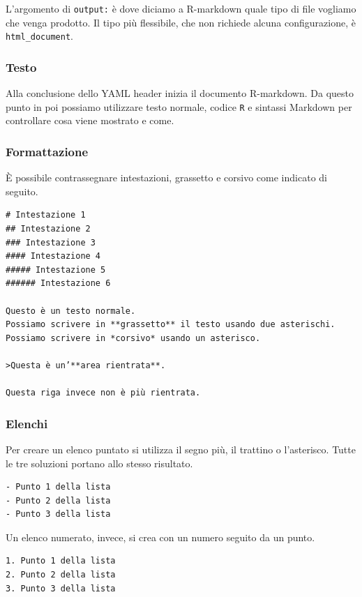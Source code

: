 \documentclass[
]{memoir}
\theoremstyle{definition}
\theoremstyle{definition}
\theoremstyle{definition}
\theoremstyle{definition}
\theoremstyle{remark}
\begin{document}
L'argomento di \texttt{output:} è dove diciamo a R-markdown quale tipo di file vogliamo che venga prodotto. Il tipo più flessibile, che non richiede alcuna configurazione, è \texttt{html\_document}.

\hypertarget{testo}{%
\subsubsection{Testo}\label{testo}}

Alla conclusione dello YAML header inizia il documento R-markdown. Da questo punto in poi possiamo utilizzare testo normale, codice \texttt{R} e sintassi Markdown per controllare cosa viene mostrato e come.

\hypertarget{formattazione}{%
\subsubsection{Formattazione}\label{formattazione}}

È possibile contrassegnare intestazioni, grassetto e corsivo come indicato di seguito.

\begin{verbatim}
# Intestazione 1
## Intestazione 2
### Intestazione 3
#### Intestazione 4
##### Intestazione 5
###### Intestazione 6

Questo è un testo normale.
Possiamo scrivere in **grassetto** il testo usando due asterischi.
Possiamo scrivere in *corsivo* usando un asterisco.

>Questa è un’**area rientrata**.

Questa riga invece non è più rientrata.
\end{verbatim}

\hypertarget{elenchi}{%
\subsubsection{Elenchi}\label{elenchi}}

Per creare un elenco puntato si utilizza il segno più, il trattino o l'asterisco. Tutte le tre soluzioni portano allo stesso risultato.

\begin{verbatim}
- Punto 1 della lista
- Punto 2 della lista
- Punto 3 della lista
\end{verbatim}

Un elenco numerato, invece, si crea con un numero seguito da un punto.

\begin{verbatim}
1. Punto 1 della lista
2. Punto 2 della lista
3. Punto 3 della lista
\end{verbatim}
\end{document}
